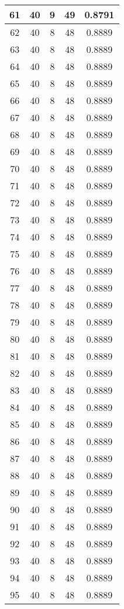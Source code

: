 \documentclass[letterpaper, 12pt]{article}
\begin{document}
\begin{longtable}{|c|c|c|c|c|}
\hline
61 & 40 & 9 & 49 & 0.8791 \\
\hline
62 & 40 & 8 & 48 & 0.8889 \\
\hline
63 & 40 & 8 & 48 & 0.8889 \\
\hline
64 & 40 & 8 & 48 & 0.8889 \\
\hline
65 & 40 & 8 & 48 & 0.8889 \\
\hline
66 & 40 & 8 & 48 & 0.8889 \\
\hline
67 & 40 & 8 & 48 & 0.8889 \\
\hline
68 & 40 & 8 & 48 & 0.8889 \\
\hline
69 & 40 & 8 & 48 & 0.8889 \\
\hline
70 & 40 & 8 & 48 & 0.8889 \\
\hline
71 & 40 & 8 & 48 & 0.8889 \\
\hline
72 & 40 & 8 & 48 & 0.8889 \\
\hline
73 & 40 & 8 & 48 & 0.8889 \\
\hline
74 & 40 & 8 & 48 & 0.8889 \\
\hline
75 & 40 & 8 & 48 & 0.8889 \\
\hline
76 & 40 & 8 & 48 & 0.8889 \\
\hline
77 & 40 & 8 & 48 & 0.8889 \\
\hline
78 & 40 & 8 & 48 & 0.8889 \\
\hline
79 & 40 & 8 & 48 & 0.8889 \\
\hline
80 & 40 & 8 & 48 & 0.8889 \\
\hline
81 & 40 & 8 & 48 & 0.8889 \\
\hline
82 & 40 & 8 & 48 & 0.8889 \\
\hline
83 & 40 & 8 & 48 & 0.8889 \\
\hline
84 & 40 & 8 & 48 & 0.8889 \\
\hline
85 & 40 & 8 & 48 & 0.8889 \\
\hline
86 & 40 & 8 & 48 & 0.8889 \\
\hline
87 & 40 & 8 & 48 & 0.8889 \\
\hline
88 & 40 & 8 & 48 & 0.8889 \\
\hline
89 & 40 & 8 & 48 & 0.8889 \\
\hline
90 & 40 & 8 & 48 & 0.8889 \\
\hline
91 & 40 & 8 & 48 & 0.8889 \\
\hline
92 & 40 & 8 & 48 & 0.8889 \\
\hline
93 & 40 & 8 & 48 & 0.8889 \\
\hline
94 & 40 & 8 & 48 & 0.8889 \\
\hline
95 & 40 & 8 & 48 & 0.8889 \\

\end{longtable}
\end{document}
